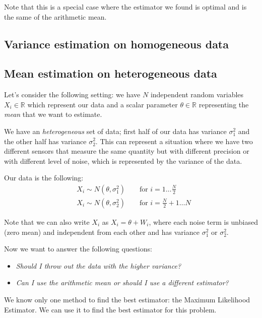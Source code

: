 Note that this is a special case where the estimator we found is optimal and is the same of the arithmetic mean.

\subsection{Variance estimation on homogeneous data}
\subsection{Mean estimation on heterogeneous data} \label{sec:ex_1}

Let's consider the following setting: we have $N$ independent random variables $X_i \in \mathbb{R}$ which represent our data and a scalar parameter $\theta \in \mathbb{R}$ representing the \textit{mean} that we want to estimate.

We have an \textit{heterogeneous} set of data; first half of our data has variance $\sigma_1^2$ and the other half has variance $\sigma_2^2$. This can represent a situation where we have two different sensors that measure the same quantity but with different precision or with different level of noise, which is represented by the variance of the data.

Our data is the following:
\begin{align*}
     & X_i \sim N(\theta, \sigma_1^2) \qquad \text{for } i = 1 \dots \frac{N}{2}     \\
     & X_i \sim N(\theta, \sigma_2^2) \qquad \text{for } i = \frac{N}{2} + 1 \dots N
\end{align*}

Note that we can also write $X_i$ as $X_i = \theta + W_i$, where each noise term is unbiased (zero mean) and independent from each other and has variance $\sigma_1^2$ or $\sigma_2^2$.

Now we want to answer the following questions:
\begin{itemize}
    \item \textit{Should I throw out the data with the higher variance?}
    \item \textit{Can I use the arithmetic mean or should I use a different estimator?}
\end{itemize}

We know only one method to find the best estimator: the Maximum Likelihood Estimator. We can use it to find the best estimator for this problem.

